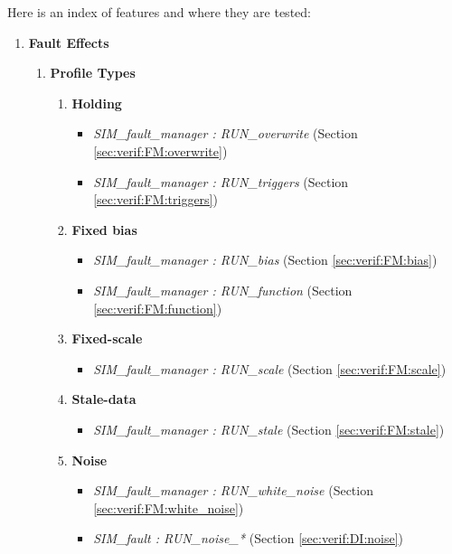 \documentclass[11pt,fleqn]{report}
\begin{document}
\par Here is an index of features and where they are tested:
\begin{flushleft}
\begin{enumerate}
 \item \textbf{Fault Effects}
  \begin{enumerate}
   \item \textbf{Profile Types}
    \begin{enumerate}

     \item \textbf{Holding}
      \begin{itemize}
       \item \textit{SIM\_fault\_manager : RUN\_overwrite}
         (Section \ref{sec:verif:FM:overwrite})
       \item \textit{SIM\_fault\_manager : RUN\_triggers}
         (Section \ref{sec:verif:FM:triggers})
      \end{itemize}

     \item \textbf{Fixed bias}
      \begin{itemize}
       \item \textit{SIM\_fault\_manager : RUN\_bias}
         (Section \ref{sec:verif:FM:bias})
       \item \textit{SIM\_fault\_manager : RUN\_function}
         (Section \ref{sec:verif:FM:function})
      \end{itemize}

     \item \textbf{Fixed-scale}
      \begin{itemize}
       \item \textit{SIM\_fault\_manager : RUN\_scale}
         (Section \ref{sec:verif:FM:scale})
      \end{itemize}

     \item \textbf{Stale-data}
      \begin{itemize}
       \item \textit{SIM\_fault\_manager : RUN\_stale}
         (Section \ref{sec:verif:FM:stale})
      \end{itemize}

     \item \textbf{Noise}
      \begin{itemize}
       \item \textit{SIM\_fault\_manager : RUN\_white\_noise}
         (Section \ref{sec:verif:FM:white_noise})
       \item \textit{SIM\_fault : RUN\_noise\_*}
         (Section \ref{sec:verif:DI:noise})
      \end{itemize}


\end{enumerate}
\end{enumerate}
\end{enumerate}
\end{flushleft}
\end{document}
